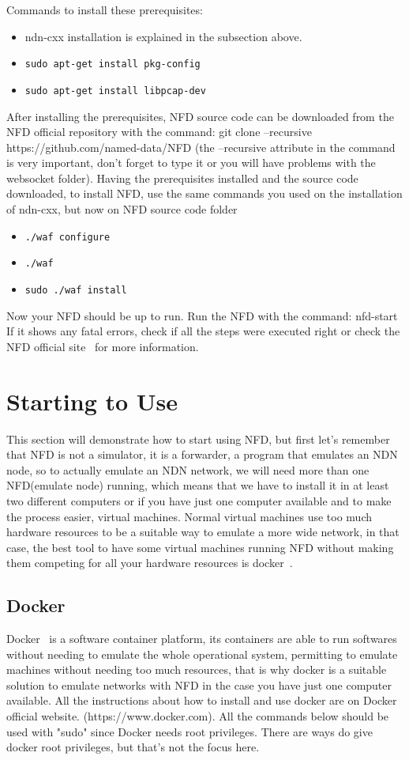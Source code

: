 \documentclass[10pt,letterpaper,extrafontsizes]{memoir}
\begin{document}
	Commands to install these prerequisites:
	\begin{itemize}
		\item ndn-cxx installation is explained in the subsection above.
		
		\item \texttt{sudo apt-get install pkg-config}
		
		\item \texttt{sudo apt-get install libpcap-dev}
	\end{itemize}
After installing the prerequisites, NFD source code can be downloaded from the NFD official repository with the command: git clone --recursive https://github.com/named-data/NFD (the --recursive attribute in the command is very important, don't forget to type it or you will have problems with the websocket folder).
Having the prerequisites installed and the source code downloaded, to install NFD, use the same commands you used on the installation of ndn-cxx, but now on NFD source code folder
\begin{itemize}
 \item \texttt{./waf configure} 
 \item \texttt{./waf}
 \item \texttt{sudo ./waf install}
\end{itemize}
Now your NFD should be up to run. Run the NFD with the command: nfd-start
If it shows any fatal errors, check if all the steps were executed right or check the NFD official site~\cite{NFD} for more information.
\chapter{Starting to Use}
This section will demonstrate how to start using NFD, but first let's remember that NFD is not a simulator, it is a forwarder, a program that emulates an NDN node, so to actually emulate an NDN network, we will need more than one NFD(emulate node) running, which means that we have to install it in at least two different computers or if you have just one computer available and to make the process easier, virtual machines.
Normal virtual machines use too much hardware resources to be a suitable way to emulate a more wide network, in that case, the best tool to have some virtual machines running NFD without making them competing for all your hardware resources is docker~\cite{docker}. 

\section{Docker}
Docker~\cite{docker} is a software container platform, its containers are able to run softwares without needing to emulate the whole operational system, permitting to emulate machines without needing too much resources, that is why docker is a suitable solution to emulate networks with NFD in the case you have just one computer available.
All the instructions about how to install and use docker are on Docker official website. (https://www.docker.com).
All the commands below should be used with "sudo" since Docker needs root privileges. There are ways do give docker root privileges, but that's not the focus here.
\end{document}
